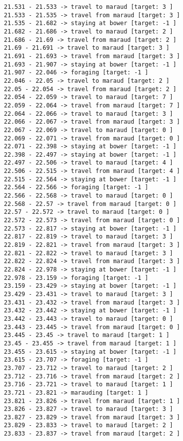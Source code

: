 \documentclass[11pt]{article}
\begin{document}
\begin{Verbatim}[commandchars=\\\{\}]
21.531 - 21.533 -> travel to maraud [target: 3 ]
21.533 - 21.535 -> travel from maraud [target: 3 ]
21.535 - 21.682 -> staying at bower [target: -1 ]
21.682 - 21.686 -> travel to maraud [target: 2 ]
21.686 - 21.69 -> travel from maraud [target: 2 ]
21.69 - 21.691 -> travel to maraud [target: 3 ]
21.691 - 21.693 -> travel from maraud [target: 3 ]
21.693 - 21.907 -> staying at bower [target: -1 ]
21.907 - 22.046 -> foraging [target: -1 ]
22.046 - 22.05 -> travel to maraud [target: 2 ]
22.05 - 22.054 -> travel from maraud [target: 2 ]
22.054 - 22.059 -> travel to maraud [target: 7 ]
22.059 - 22.064 -> travel from maraud [target: 7 ]
22.064 - 22.066 -> travel to maraud [target: 3 ]
22.066 - 22.067 -> travel from maraud [target: 3 ]
22.067 - 22.069 -> travel to maraud [target: 0 ]
22.069 - 22.071 -> travel from maraud [target: 0 ]
22.071 - 22.398 -> staying at bower [target: -1 ]
22.398 - 22.497 -> staying at bower [target: -1 ]
22.497 - 22.506 -> travel to maraud [target: 4 ]
22.506 - 22.515 -> travel from maraud [target: 4 ]
22.515 - 22.564 -> staying at bower [target: -1 ]
22.564 - 22.566 -> foraging [target: -1 ]
22.566 - 22.568 -> travel to maraud [target: 0 ]
22.568 - 22.57 -> travel from maraud [target: 0 ]
22.57 - 22.572 -> travel to maraud [target: 0 ]
22.572 - 22.573 -> travel from maraud [target: 0 ]
22.573 - 22.817 -> staying at bower [target: -1 ]
22.817 - 22.819 -> travel to maraud [target: 3 ]
22.819 - 22.821 -> travel from maraud [target: 3 ]
22.821 - 22.822 -> travel to maraud [target: 3 ]
22.822 - 22.824 -> travel from maraud [target: 3 ]
22.824 - 22.978 -> staying at bower [target: -1 ]
22.978 - 23.159 -> foraging [target: -1 ]
23.159 - 23.429 -> staying at bower [target: -1 ]
23.429 - 23.431 -> travel to maraud [target: 3 ]
23.431 - 23.432 -> travel from maraud [target: 3 ]
23.432 - 23.442 -> staying at bower [target: -1 ]
23.442 - 23.443 -> travel to maraud [target: 0 ]
23.443 - 23.445 -> travel from maraud [target: 0 ]
23.445 - 23.45 -> travel to maraud [target: 1 ]
23.45 - 23.455 -> travel from maraud [target: 1 ]
23.455 - 23.615 -> staying at bower [target: -1 ]
23.615 - 23.707 -> foraging [target: -1 ]
23.707 - 23.712 -> travel to maraud [target: 2 ]
23.712 - 23.716 -> travel from maraud [target: 2 ]
23.716 - 23.721 -> travel to maraud [target: 1 ]
23.721 - 23.821 -> marauding [target: 1 ]
23.821 - 23.826 -> travel from maraud [target: 1 ]
23.826 - 23.827 -> travel to maraud [target: 3 ]
23.827 - 23.829 -> travel from maraud [target: 3 ]
23.829 - 23.833 -> travel to maraud [target: 2 ]
23.833 - 23.837 -> travel from maraud [target: 2 ]

\end{Verbatim}
\end{document}

